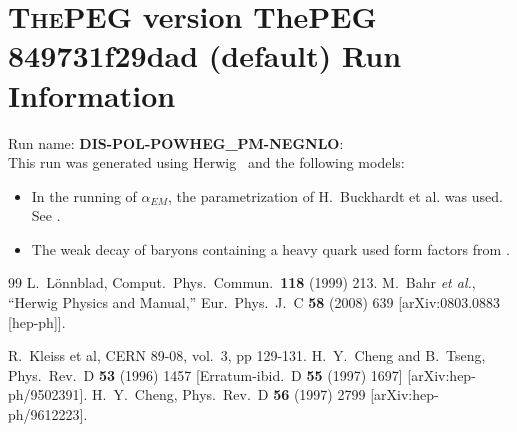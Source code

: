 \documentclass{article}
\begin{document}
\appendix
\section[xxx]{\textsc{ThePEG} version ThePEG 849731f29dad (default) \cite{ThePEG} Run Information}
Run name: \textbf{DIS-POL-POWHEG_PM-NEGNLO}:\\
This run was generated using Herwig~\cite{Bahr:2008pv} and the following models:
\begin{itemize}
\item In the running of $\alpha_{EM}$, the parametrization of H.~Buckhardt et al. was used. See \cite{KLEISSCERN9808v3pp129}.
\item The weak decay of baryons containing a heavy quark used form factors from \cite{Cheng:1995fe,Cheng:1996cs}.
\end{itemize}

\begin{thebibliography}{99}
 L.~L\"onnblad, Comput.~Phys.~Commun.\ {\bf 118} (1999) 213.
  M.~Bahr {\it et al.},
  ``Herwig Physics and Manual,''
  Eur.\ Phys.\ J.\  C {\bf 58} (2008) 639
  [arXiv:0803.0883 [hep-ph]].

 R.~Kleiss et al, CERN 89-08, vol.~3, pp 129-131.
  H.~Y.~Cheng and B.~Tseng,
  Phys.\ Rev.\  D {\bf 53} (1996) 1457
  [Erratum-ibid.\  D {\bf 55} (1997) 1697]
  [arXiv:hep-ph/9502391].
  H.~Y.~Cheng,
  Phys.\ Rev.\  D {\bf 56} (1997) 2799
  [arXiv:hep-ph/9612223].

\end{thebibliography}
\end{document}
